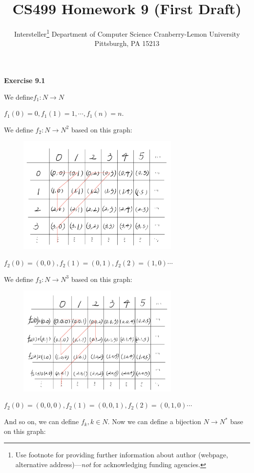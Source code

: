 \documentclass{article} %
\title{CS499 Homework 9 (First Draft)}
\author{
	Intersteller\thanks{ Use footnote for providing further information
		about author (webpage, alternative address)---\emph{not} for acknowledging
		funding agencies.}
	Department of Computer Science
	Cranberry-Lemon University
	Pittsburgh, PA 15213
}
\begin{document}
	
	
	\maketitle
	
	
	\textbf{Exercise 9.1}\par
    We define$f_1:N\rightarrow N$\par
    $f_1\left(0\right)=0,
    f_1\left(1\right)=1,
    \cdots,
    f_1\left(n\right)=n.
    $\par
    We define $f_2:N\rightarrow N^2$ based on this graph:
    \begin{figure}[H]
  	\centering
  	\includegraphics[width=8cm]{9_1_1.png}
  	\caption{}
  	\label{}
  	\end{figure}
    $f_2\left(0\right)=\left(0,0\right),f_2\left(1\right)=\left(0,1\right),f_2\left(2\right)=\left(1,0\right)\cdots$\par
    We define $f_3:N\rightarrow N^3$ based on this graph:
   \begin{figure}[H]
  	\centering
  	\includegraphics[width=8cm]{9_1_2.png}
  	\caption{}
  	\label{}
  	\end{figure}
    $f_2\left(0\right)=\left(0,0,0\right),f_2\left(1\right)=\left(0,0,1\right),f_2\left(2\right)=\left(0,1,0\right)\cdots$\par
    And so on, we can define $f_k,k\in N$.
    Now we can define a bijection $N\rightarrow N^*$ base on this graph:
\end{document}
